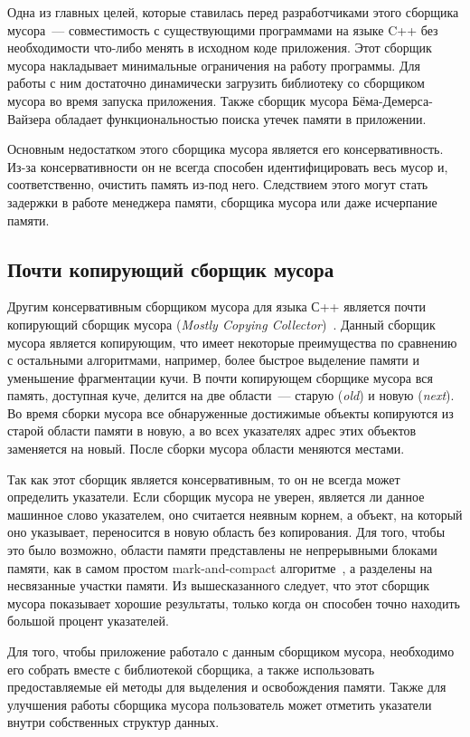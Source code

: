 Одна из главных целей, которые ставилась перед разработчиками этого сборщика мусора~--- совместимость с существующими программами на языке C++ без необходимости что-либо менять в исходном коде приложения. Этот сборщик  мусора накладывает минимальные ограничения на работу программы. Для работы с ним достаточно динамически загрузить библиотеку со сборщиком мусора во время запуска приложения. Также сборщик мусора Бёма-Демерса-Вайзера обладает функциональностью поиска утечек памяти в приложении.

Основным недостатком этого сборщика мусора является его консервативность. Из-за консервативности он не всегда способен идентифицировать весь мусор и, соответственно, очистить память из-под него. Следствием этого могут стать задержки в работе менеджера памяти, сборщика мусора или даже исчерпание памяти. 

\subsection{Почти копирующий сборщик мусора}
Другим консервативным сборщиком мусора для языка С++ является почти копирующий сборщик мусора (\textit{Mostly Copying Collector})~\cite{mcc1, mcc2}. 
Данный сборщик мусора является копирующим, что имеет некоторые преимущества по сравнению с остальными алгоритмами, например, более быстрое выделение памяти и уменьшение фрагментации кучи. В почти копирующем сборщике мусора вся память, доступная куче, делится на две области~--- старую (\textit{old}) и новую (\textit{next}). Во время сборки мусора все обнаруженные достижимые объекты копируются из старой области памяти в новую, а во всех указателях адрес этих объектов заменяется на новый. После сборки мусора области меняются местами. 

Так как этот сборщик является консервативным, то он не всегда может определить указатели. Если сборщик мусора не уверен, является ли данное машинное слово указателем, оно считается неявным корнем, а объект, на который оно указывает, переносится в новую область без копирования. Для того, чтобы это было возможно, области памяти представлены не непрерывными блоками памяти, как в самом простом mark-and-compact алгоритме~\cite{lisp-copy}, а разделены на несвязанные участки памяти. Из вышесказанного следует, что этот сборщик мусора показывает хорошие результаты, только когда он способен точно находить большой процент указателей.

Для того, чтобы приложение работало с данным сборщиком мусора, необходимо его собрать вместе с библиотекой сборщика, а также использовать предоставляемые ей методы для выделения и освобождения памяти. Также для улучшения работы сборщика мусора пользователь может отметить указатели внутри собственных структур данных.

